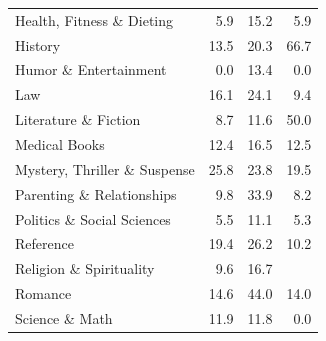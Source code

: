 \documentclass[12pt]{article}
\numberwithin{equation}{section}
\numberwithin{figure}{section}
\begin{document}
\begin{table}[]
{\begin{tabular}{lrrr}
	Health, Fitness \& Dieting    & 5.9                                      & 15.2                                            & 5.9                                    \\
	History                       & 13.5                                     & 20.3                                            & 66.7                                   \\
	Humor \& Entertainment        & 0.0                                      & 13.4                                            & 0.0                                    \\
	Law                           & 16.1                                     & 24.1                                            & 9.4                                    \\
	Literature \& Fiction         & 8.7                                      & 11.6                                            & 50.0                                   \\
	Medical Books                 & 12.4                                     & 16.5                                            & 12.5                                   \\
	Mystery, Thriller \& Suspense & 25.8                                     & 23.8                                            & 19.5                                   \\
	Parenting \& Relationships    & 9.8                                      & 33.9                                            & 8.2                                    \\
	Politics \& Social Sciences   & 5.5                                      & 11.1                                            & 5.3                                    \\
	Reference                     & 19.4                                     & 26.2                                            & 10.2                                   \\
	Religion \& Spirituality      & 9.6                                      & 16.7                                            &                                        \\
	Romance                       & 14.6                                     & 44.0                                            & 14.0                                   \\
	Science \& Math               & 11.9                                     & 11.8                                            & 0.0                                    \\

\end{tabular}}
\end{table}
\end{document}
